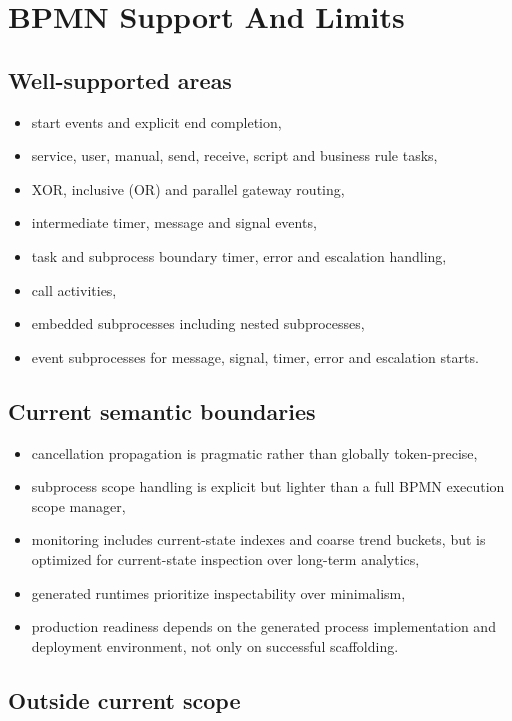 \section{BPMN Support And Limits}
\label{sec:SupportLimits}

\subsection{Well-supported areas}

\begin{itemize}
\item start events and explicit end completion,
\item service, user, manual, send, receive, script and business rule tasks,
\item XOR, inclusive (OR) and parallel gateway routing,
\item intermediate timer, message and signal events,
\item task and subprocess boundary timer, error and escalation handling,
\item call activities,
\item embedded subprocesses including nested subprocesses,
\item event subprocesses for message, signal, timer, error and escalation starts.
\end{itemize}

\subsection{Current semantic boundaries}

\begin{itemize}
\item cancellation propagation is pragmatic rather than globally token-precise,
\item subprocess scope handling is explicit but lighter than a full BPMN execution scope manager,
\item monitoring includes current-state indexes and coarse trend buckets, but is
  optimized for current-state inspection over long-term analytics,
\item generated runtimes prioritize inspectability over minimalism,
\item production readiness depends on the generated process implementation and
  deployment environment, not only on successful scaffolding.
\end{itemize}

\subsection{Outside current scope}

